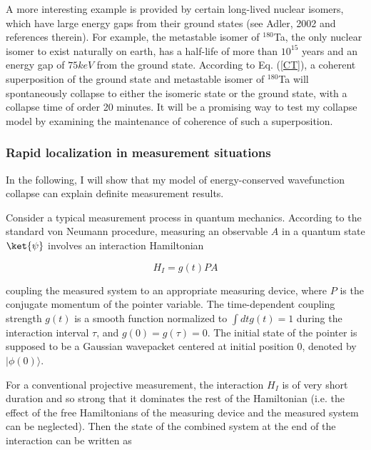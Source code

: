 A more interesting example is provided by certain long-lived nuclear isomers, which have large energy gaps from their ground states (see Adler, 2002 and references therein). For example, the metastable isomer of $^{180}$Ta, the only nuclear isomer to exist naturally on earth, has a half-life of more than $10^{15}$ years and an energy gap of $75keV$ from the ground state. According to Eq. (\ref{CT}), a coherent superposition of the ground state and metastable isomer of $^{180}$Ta will spontaneously collapse to either the isomeric state or the ground state, with a collapse time of order 20 minutes. It will be a promising way to test my collapse model by examining the maintenance of coherence of such a superposition.

\subsubsection{Rapid localization in measurement situations}

In the following, I will show that my model of energy-conserved wavefunction collapse can explain definite measurement results. 

Consider a typical measurement process in quantum mechanics. According to the standard von Neumann procedure, measuring an observable $A$ in a quantum state $\ket{\psi}$ involves an interaction Hamiltonian

\begin{equation}
H_I = g(t)PA
\label{H_i}
\end{equation} 

\noindent coupling the measured system to an appropriate measuring device, where $P$ is the conjugate momentum of the pointer variable. The time-dependent coupling strength $g(t)$ is a smooth function normalized to $\int dt g(t)=1$ during the interaction interval $\tau$, and $g(0)=g(\tau)=0$. The initial state of the pointer is supposed to be a Gaussian wavepacket centered at initial position $0$, denoted by $|\phi(0)\rangle$.

For a conventional projective measurement, the interaction $H_I$  is of very short duration and so strong that it dominates the rest of the Hamiltonian (i.e. the effect of the free Hamiltonians of the measuring device and the measured system can be neglected). Then the state of the combined system at the end of the interaction can be written as

